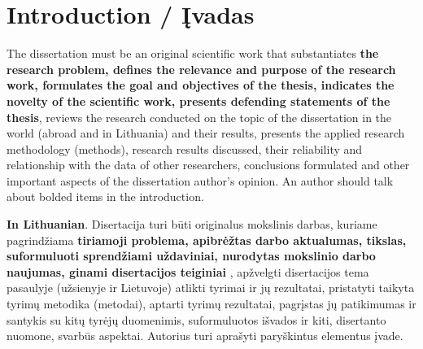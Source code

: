     

\chapter*{Introduction / Įvadas}
\label{cha:intro_lt}

The dissertation must be an original scientific work that substantiates \textbf{the research problem, defines the relevance and purpose of the research work, formulates the goal and objectives of the thesis, indicates the novelty of the scientific work, presents defending statements of the thesis}, reviews the research conducted on the topic of the dissertation in the world (abroad and in Lithuania) and their results, presents the applied research methodology (methods), research results discussed, their reliability and relationship with the data of other researchers, conclusions formulated and other important aspects of the dissertation author's opinion. 
An author should talk about bolded items in the introduction.

\textbf{In Lithuanian}. Disertacija turi būti originalus mokslinis darbas, kuriame pagrindžiama \textbf{tiriamoji problema, apibrėžtas darbo aktualumas, tikslas, suformuluoti sprendžiami uždaviniai, nurodytas mokslinio darbo naujumas, ginami disertacijos teiginiai} , apžvelgti disertacijos tema pasaulyje (užsienyje ir Lietuvoje) atlikti tyrimai ir jų rezultatai, pristatyti taikyta tyrimų metodika (metodai), aptarti tyrimų rezultatai, pagrįstas jų patikimumas ir santykis su kitų tyrėjų duomenimis, suformuluotos išvados ir kiti, disertanto nuomone, svarbūs aspektai.
Autorius turi aprašyti paryškintus elementus įvade.


